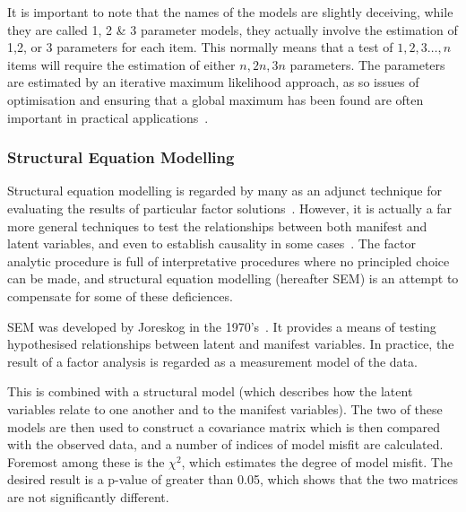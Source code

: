 
It is important to note that the names of the models are slightly deceiving, while they are called 1, 2 \& 3 parameter models, they actually involve the estimation of 1,2, or 3 parameters for each item. This normally means that a test of ${1,2,3\ldots, n}$ items will require the estimation of either ${n, 2n, 3n}$ parameters. The parameters are estimated by an iterative maximum likelihood approach, as so issues of optimisation and ensuring that a global maximum has been found are often important in practical applications~\cite{gill2002bayesian}.


\subsubsection{Structural Equation Modelling}
\label{sec:struct-equat-model}

Structural equation modelling is regarded by many as an adjunct technique for evaluating the results of particular factor solutions~\cite{fabrigar1999evaluating}. However, it is actually a far more general techniques to test the relationships between both manifest and latent variables, and even to establish causality in some cases~\cite{pearl1998graphs}. The factor analytic procedure is full of interpretative procedures where no principled choice can be made, and structural equation modelling (hereafter SEM) is an attempt to compensate for some of these deficiences.

SEM was developed by Joreskog in the 1970's~\cite{joreskog1978structural}. It provides a means of testing hypothesised relationships between latent and manifest variables. In practice, the result of a factor analysis is regarded as a measurement model of the data.

This is combined with a structural model (which describes how the latent variables relate to one another and to the manifest variables). The two of these models are then used to construct a covariance matrix which is then compared with the observed data, and a number of indices of model misfit are calculated. Foremost among these is the $\chi^2$, which estimates the degree of model misfit. The desired result is a p-value of greater than 0.05, which shows that the two matrices are not significantly different.

